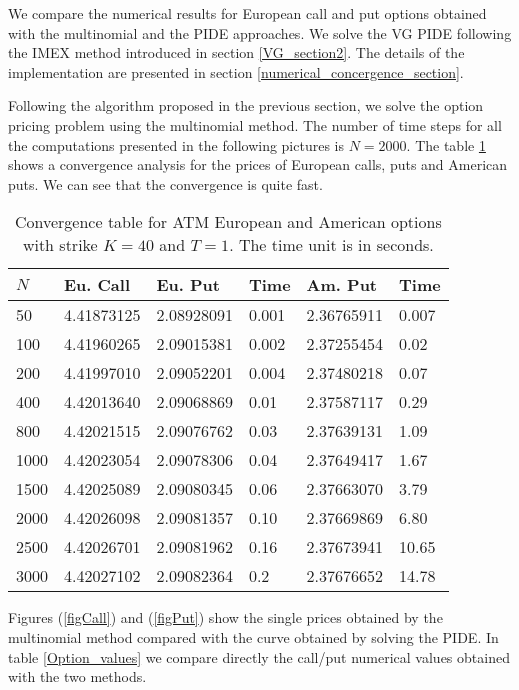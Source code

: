 We compare the numerical results for European call and put options obtained with the multinomial and the PIDE approaches.
We solve the VG PIDE following the IMEX method introduced in section \ref{VG_section2}.
The details of the implementation are presented in section \ref{numerical_concergence_section}.

Following the algorithm proposed in the previous section, we solve the option pricing problem using the multinomial method. 
The number of time steps for all the computations presented in the following pictures is $N=2000$. 
The table \ref{Convergence} 
shows a convergence analysis for the prices of European calls, puts and American puts. We can see that the convergence is quite fast.  
\begin{table}[ht]
\centering
{\begin{tabular}{llllll}
\toprule
  $N$ & Eu. Call & Eu. Put & Time & Am. Put & Time \\
\midrule
    50 & 4.41873125 & 2.08928091 & 0.001 & 2.36765911 & 0.007 \\
    100 & 4.41960265 & 2.09015381 & 0.002 & 2.37255454 & 0.02 \\
    200 & 4.41997010 & 2.09052201 & 0.004 & 2.37480218 & 0.07 \\
    400 & 4.42013640 & 2.09068869 & 0.01 & 2.37587117 & 0.29 \\
    800 & 4.42021515 & 2.09076762 & 0.03 & 2.37639131 & 1.09 \\
    1000 & 4.42023054 & 2.09078306 & 0.04 & 2.37649417 & 1.67 \\
    1500 & 4.42025089 & 2.09080345 & 0.06 & 2.37663070 & 3.79 \\
    2000 & 4.42026098 & 2.09081357 & 0.10 & 2.37669869 & 6.80 \\
    2500 & 4.42026701 & 2.09081962 & 0.16 & 2.37673941 & 10.65 \\
    3000 & 4.42027102 & 2.09082364 & 0.2 & 2.37676652 & 14.78 \\
  \bottomrule
\end{tabular}}
\caption{Convergence table for ATM European and American options with strike $K=40$ and $T=1$. The time unit is in seconds.}
\label{Convergence}
\end{table}
Figures (\ref{figCall}) and (\ref{figPut}) show the single prices obtained by the multinomial method compared with the curve obtained by solving the PIDE.
In table \ref{Option_values} we compare directly the call/put numerical values obtained with the two methods.
